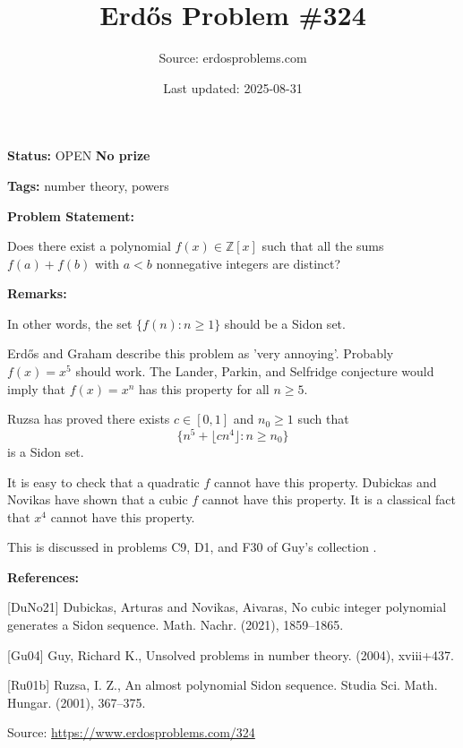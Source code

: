 \documentclass{article}
\title{Erd\H{o}s Problem \#324}
\date{Last updated: 2025-08-31}
\author{Source: erdosproblems.com}
\begin{document}
\maketitle

\noindent\textbf{Status:} OPEN \quad \textbf{No prize}

\noindent\textbf{Tags:} number theory, powers

\medskip
\noindent\textbf{Problem Statement:}

Does there exist a polynomial $f(x)\in\mathbb{Z}[x]$ such that all the sums $f(a)+f(b)$ with $a<b$ nonnegative integers are distinct?

\bigskip
\noindent\textbf{Remarks:}

In other words, the set $\{ f(n) : n\geq 1\}$ should be a Sidon set.

Erd\H{o}s and Graham describe this problem as 'very annoying'. Probably $f(x)=x^5$ should work. The Lander, Parkin, and Selfridge conjecture would imply that $f(x)=x^n$ has this property for all $n\geq 5$.

Ruzsa \cite{Ru01b} has proved there exists $c\in [0,1]$ and $n_0\geq 1$ such that\[\{ n^5 +\lfloor cn^4\rfloor : n \geq n_0\}\]is a Sidon set.

It is easy to check that a quadratic $f$ cannot have this property. Dubickas and Novikas \cite{DuNo21} have shown that a cubic $f$ cannot have this property. It is a classical fact that $x^4$ cannot have this property.

This is discussed in problems C9, D1, and F30 of Guy's collection \cite{Gu04}.

\bigskip
\noindent\textbf{References:}

[DuNo21] Dubickas, Arturas and Novikas, Aivaras, No cubic integer polynomial generates a Sidon sequence. Math. Nachr. (2021), 1859--1865.
 
 [Gu04] Guy, Richard K., Unsolved problems in number theory. (2004), xviii+437.
 
 [Ru01b] Ruzsa, I. Z., An almost polynomial Sidon sequence. Studia Sci. Math. Hungar. (2001), 367--375.

\bigskip
\noindent\small{Source: \url{https://www.erdosproblems.com/324}}
\end{document}
